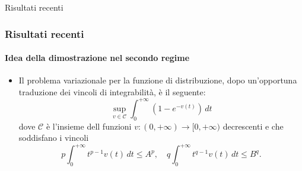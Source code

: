 \documentclass[aspectratio=141]{beamer}
\begin{document}
\begin{section}{Risultati recenti}
	\begin{frame}
		\frametitle{Risultati recenti}
		\framesubtitle{Idea della dimostrazione nel secondo regime}
		\begin{itemize}
			\item Il problema variazionale per la funzione di distribuzione, dopo un'opportuna traduzione dei vincoli di integrabilità, è il seguente:
			\begin{equation*}
				\sup_{v \in \mathcal{C}} \int_0^{+\infty} (1-e^{-v(t)}) \, dt
			\end{equation*}
			dove $\mathcal{C}$ è l'insieme dell funzioni  $v : (0, +\infty) \rightarrow [0, +\infty)$ decrescenti e che soddisfano i vincoli
			\begin{equation*}
				p\int_{0}^{+\infty} t^{p-1} v(t) \, dt \leq A^p,\quad q\int_{0}^{+\infty} t^{q-1} v(t) \, dt \leq B^q .
			\end{equation*} 
		\end{itemize}
	\end{frame}


\end{section}
\end{document}
